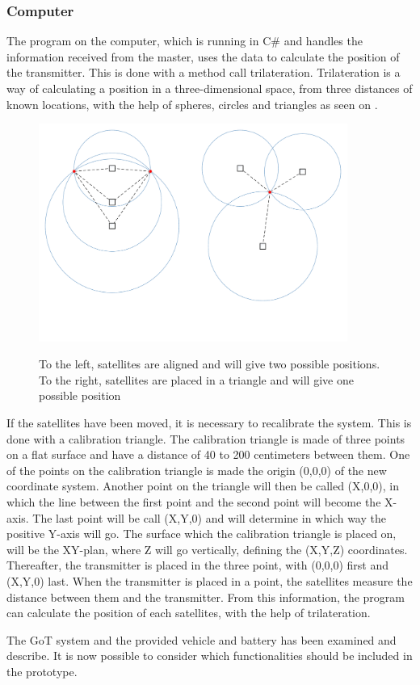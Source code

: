 \subsubsection{Computer}
The program on the computer, which is running in C\# and handles the information received from the master, uses the data to calculate the position of the transmitter. This is done with a method call trilateration. Trilateration is a way of calculating a position in a three-dimensional space, from three distances of known locations, with the help of spheres, circles and triangles as seen on .
%
\begin{figure}[H]
  \centering
  {
    \includegraphics[width=0.9\textwidth]{figures/GoT_SingleVsTriangle.pdf}
  }
  \caption{To the left, satellites are aligned and will give two possible positions. To the right, satellites are placed in a triangle and will give one possible position}
  \label{GoTTriVSLine}
\end{figure}
%
If the satellites have been moved, it is necessary to recalibrate the system. This is done with a calibration triangle. The calibration triangle is made of three points on a flat surface and have a distance of 40 to 200 centimeters between them. One of the points on the calibration triangle is made the origin (0,0,0) of the new coordinate system. Another point on the triangle will then be called (X,0,0), in which the line between the first point and the second point will become the X-axis. The last point will be call (X,Y,0) and will determine in which way the positive Y-axis will go. The surface which the calibration triangle is placed on, will be the XY-plan, where Z will go vertically, defining the (X,Y,Z) coordinates. Thereafter, the transmitter is placed in the three point, with (0,0,0) first and (X,Y,0) last. When the transmitter is placed in a point, the satellites measure the distance between them and the transmitter. From this information, the program can calculate the position of each satellites, with the help of trilateration.

The GoT system and the provided vehicle and battery has been examined and describe. It is now possible to consider which functionalities should be included in the prototype.